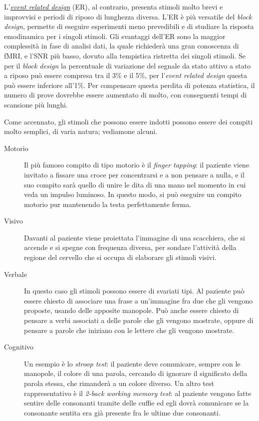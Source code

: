 \documentclass{report}
\numberwithin{equation}{section}
\numberwithin{figure}{section}
\begin{document}
L'\underline{\textit{event related design}} (ER), al contrario, presenta stimoli molto brevi e improvvisi e periodi di riposo di lunghezza diversa. L'ER è più versatile del \textit{block design}, permette di eseguire esperimenti meno prevedibili e di studiare la risposta emodinamica per i singoli stimoli. Gli svantaggi dell'ER sono la maggior complessità in fase di analisi dati, la quale richiederà una gran conoscenza di fMRI, e l'SNR più basso, dovuto alla tempistica ristretta dei singoli stimoli. Se per il \textit{block design} la percentuale di variazione del segnale da stato attivo a stato a riposo può essere compresa tra il 3\% e il 5\%, per l'\textit{event related design} questa può essere inferiore all'1\%. Per compensare questa perdita di potenza statistica, il numero di prove dovrebbe essere aumentato di molto, con conseguenti tempi di scansione più lunghi.

Come accennato, gli stimoli che possono essere indotti possono essere dei compiti molto semplici, di varia natura; vediamone alcuni.
\begin{description}
    \item[Motorio] Il più famoso compito di tipo motorio è il \textit{finger tapping}: il paziente viene invitato a fissare una croce per concentrarsi e a non pensare a nulla, e il suo compito sarà quello di unire le dita di una mano nel momento in cui veda un impulso luminoso. In questo modo, si può eseguire un compito motorio pur mantenendo la testa perfettamente ferma.
    \item[Visivo] Davanti al paziente viene proiettata l'immagine di una scacchiera, che si accende e si spegne con frequenza diversa, per sondare l'attività della regione del cervello che si occupa di elaborare gli stimoli visivi.
    \item[Verbale] In questo caso gli stimoli possono essere di svariati tipi. Al paziente può essere chiesto di associare una frase a un'immagine fra due che gli vengono proposte, usando delle apposite manopole. Può anche essere chiesto di pensare a verbi associati a delle parole che gli vengono mostrate, oppure di pensare a parole che iniziano con le lettere che gli vengono mostrate.
    \item[Cognitivo] Un esempio è lo \textit{stroop test}: il paziente deve comunicare, sempre con le manopole, il colore di una parola, cercando di ignorare il significato della parola stessa, che rimanderà a un colore diverso. Un altro test rappresentativo è il \textit{2-back working memory test}: al paziente vengono fatte sentire delle consonanti tramite delle cuffie ed egli dovrà comunicare se la consonante sentita era già presente fra le ultime due consonanti.
\end{description}
\end{document}
